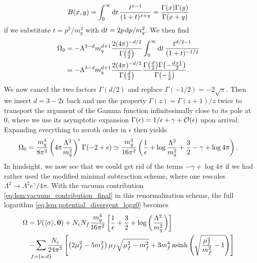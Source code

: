 \begin{equation}
	B(x,y) = \int_0^\infty \mathop{}\!\mathrm{d} t \, \frac{t^{x-1}}{(1+t)^{x+y}} = \frac{\Gamma(x) \Gamma(y)}{\Gamma(x+y)}
\end{equation}
if we substitute $t = p^2/m_q^2$ with $\mathop{}\!\mathrm{d} t = 2 p \mathop{}\!\mathrm{d} p / m_q^2$.
We then find
\begin{equation}
\begin{split}
	\Omega_0 &= -\Lambda^{3-d} m_q^{d+1} \frac{2 (4 \pi)^{-d/2}}{\Gamma\big(\frac{d}{2}\big)} \int_0^\infty \mathop{}\!\mathrm{d} t \, \frac{t^{d/2-1}}{(1+t)^{-1/2}} \\
	         &= -\Lambda^{3-d} m_q^{d+1} \frac{2 (4 \pi)^{-d/2}}{\Gamma\big(\frac{d}{2}\big)} \frac{\Gamma\big(\frac{d}{2}\big) \Gamma\big( \textstyle{-\frac{d+1}{2}} \big)}{\Gamma\big( \textstyle{-\frac{1}{2}} \big)} .
\end{split}
\end{equation}
We now cancel the two factors $\Gamma(d/2)$ and replace $\Gamma(-1/2) = -2\sqrt{\pi}$.
Then we insert $d = 3 - 2 \epsilon$ back and use the property $\Gamma(z) = \Gamma(z+1) / z$ twice to transport the argument of the Gamma function infinitesimally close to its pole at $0$,
where we use its asymptotic expansion $\Gamma(\epsilon) = 1/\epsilon + \gamma + \mathcal{O}(\epsilon)$ upon arrival.
Expanding everything to zeroth order in $\epsilon$ then yields
\begin{equation}
	\Omega_0 =       \frac{m_q^4}{8 \pi^2} \left( 4 \pi \frac{\Lambda^2}{m_q^2} \right)^\epsilon \Gamma(-2 + \epsilon)
	         \simeq \frac{m_q^4}{16 \pi^2} \left( \frac{1}{\epsilon} + \log \frac{\Lambda^2}{m_q^2} + \frac32 - \gamma + \log 4 \pi \right) .
\label{eq:lsm:vacuum_contribution_final}
\end{equation}
In hindsight, we now see that we could get rid of the terms $-\gamma + \log 4 \pi$ if we had rather used the modified minimal subtraction scheme, where one rescales $\Lambda^2 \rightarrow \Lambda^2 e^\gamma / 4 \pi$.
With the vacuum contribution \eqref{eq:lsm:vacuum_contribution_final} in this renormalization scheme, the full logarithm \eqref{eq:lsm:potential_divergent_logz0} becomes
\begin{equation}
\begin{split}
	\Omega &= \pot(\avg{\sigma},\vec{0}) + N_c N_f \frac{m_q^4}{16 \pi^2} \left[ \frac{1}{\epsilon} + \frac{3}{2} + \log\left(\frac{{\Lambda}^2}{m_q^2}\right) \right] \\
	       &- \smashoperator{\sum_{\vphantom{\big|} f=\{u,d\}}} \frac{N_c}{24 \pi^2} \left[ \left( 2 \mu_f^2 - 5 m_f^2 \right) \mu_f \sqrt{\mu_f^2 - m_f^2} + 3 m_f^4 \asinh \left( \sqrt{\frac{\mu_{\smash{f}}^2}{m_f^2}-1} \right) \right]
\end{split}
\end{equation}
